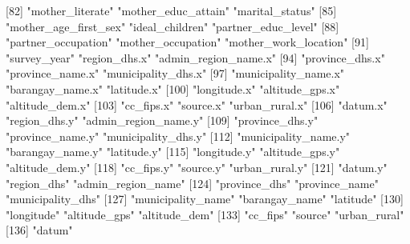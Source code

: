  [82] "mother_literate"           "mother_educ_attain"        "marital_status"           
 [85] "mother_age_first_sex"      "ideal_children"            "partner_educ_level"       
 [88] "partner_occupation"        "mother_occupation"         "mother_work_location"     
 [91] "survey_year"               "region_dhs.x"              "admin_region_name.x"      
 [94] "province_dhs.x"            "province_name.x"           "municipality_dhs.x"       
 [97] "municipality_name.x"       "barangay_name.x"           "latitude.x"               
[100] "longitude.x"               "altitude_gps.x"            "altitude_dem.x"           
[103] "cc_fips.x"                 "source.x"                  "urban_rural.x"            
[106] "datum.x"                   "region_dhs.y"              "admin_region_name.y"      
[109] "province_dhs.y"            "province_name.y"           "municipality_dhs.y"       
[112] "municipality_name.y"       "barangay_name.y"           "latitude.y"               
[115] "longitude.y"               "altitude_gps.y"            "altitude_dem.y"           
[118] "cc_fips.y"                 "source.y"                  "urban_rural.y"            
[121] "datum.y"                   "region_dhs"                "admin_region_name"        
[124] "province_dhs"              "province_name"             "municipality_dhs"         
[127] "municipality_name"         "barangay_name"             "latitude"                 
[130] "longitude"                 "altitude_gps"              "altitude_dem"             
[133] "cc_fips"                   "source"                    "urban_rural"              
[136] "datum"                    
